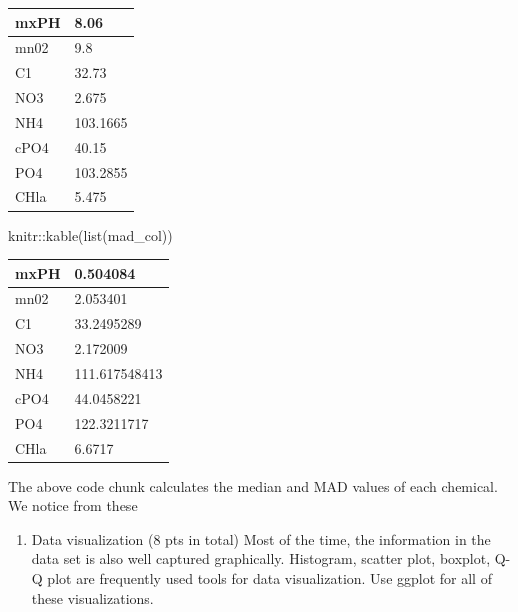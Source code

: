 \documentclass[
]{article}
\newenvironment{Shaded}{\begin{snugshade}}{\end{snugshade}}
\newcommand{\FunctionTok}[1]{\textcolor[rgb]{0.00,0.00,0.00}{#1}}
\newcommand{\NormalTok}[1]{#1}
\newcommand{\SpecialCharTok}[1]{\textcolor[rgb]{0.00,0.00,0.00}{#1}}
\providecommand{\tightlist}{%
  \setlength{\itemsep}{0pt}\setlength{\parskip}{0pt}}
\begin{document}
\begin{table}

\centering
\begin{tabular}[t]{l|l}
\hline
mxPH & 8.06\\
\hline
mn02 & 9.8\\
\hline
C1 & 32.73\\
\hline
NO3 & 2.675\\
\hline
NH4 & 103.1665\\
\hline
cPO4 & 40.15\\
\hline
PO4 & 103.2855\\
\hline
CHla & 5.475\\
\hline
\end{tabular}
\end{table}

\begin{Shaded}
\begin{Highlighting}[]
\NormalTok{knitr}\SpecialCharTok{::}\FunctionTok{kable}\NormalTok{(}\FunctionTok{list}\NormalTok{(mad\_col))}
\end{Highlighting}
\end{Shaded}

\begin{table}

\centering
\begin{tabular}[t]{l|l}
\hline
mxPH & 0.504084\\
\hline
mn02 & 2.053401\\
\hline
C1 & 33.2495289\\
\hline
NO3 & 2.172009\\
\hline
NH4 & 111.617548413\\
\hline
cPO4 & 44.0458221\\
\hline
PO4 & 122.3211717\\
\hline
CHla & 6.6717\\
\hline
\end{tabular}
\end{table}

The above code chunk calculates the median and MAD values of each
chemical. We notice from these

\begin{enumerate}
\def\labelenumi{\arabic{enumi}.}
\setcounter{enumi}{1}
\tightlist
\item
  Data visualization (8 pts in total) Most of the time, the information
  in the data set is also well captured graphically. Histogram, scatter
  plot, boxplot, Q-Q plot are frequently used tools for data
  visualization. Use ggplot for all of these visualizations.
\end{enumerate}
\end{document}
